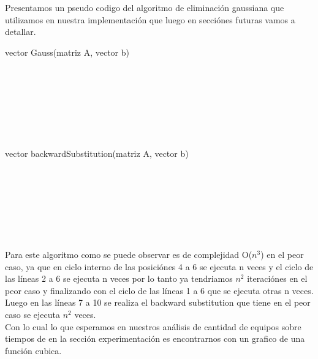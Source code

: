 Presentamos un pseudo codigo del algoritmo de eliminaci\'on gaussiana que utilizamos en nuestra implementaci\'on que luego en secci\'ones futuras vamos a detallar.

\begin{algorithm}
    \begin{algorithmic}[1]\parskip=2mm
        \caption{vector Gauss(matriz A, vector b)}
        \\
        \\
        \\
        \\
        \\
        \\
    \end{algorithmic}
\end{algorithm}


\begin{algorithm}
    \begin{algorithmic}[1]\parskip=2mm
        \caption{vector backwardSubstitution(matriz A, vector b)}
        \\
        \\
        \\
        \\
        \\
        \\
    \end{algorithmic}
\end{algorithm}

Para este algoritmo como se puede observar es de complejidad O($n^3$) en el peor caso, ya que en ciclo interno de las posici\'ones 4 a 6 se ejecuta n veces
y el ciclo de las l\'ineas 2 a 6 se ejecuta n veces por lo tanto ya tendriamos $n^2$ iteraci\'ones en el peor caso y finalizando con el ciclo de las l\'ineas 1 a 6 que se ejecuta otras n veces.
Luego en las l\'ineas 7 a 10 se realiza el backward substitution que tiene en el peor caso se ejecuta $n^2$ veces.\\
Con lo cual lo que esperamos en nuestros an\'alisis de cantidad de equipos sobre tiempos de en la secci\'on experimentaci\'on es encontrarnos con un grafico de una funci\'on cubica.

